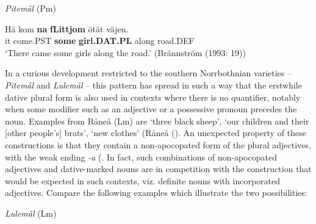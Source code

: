 
\item 

\textit{Pitemål }(Pm)



 \ea\label{}
\gll Hä  kom  \textbf{na}\textbf{  fLi{\textasciigrave}ttjom} ötät  väjen.\\


it  come.PST  \textbf{some} \textbf{girl.DAT.PL} along  road.DEF\\

\glt ‘There came some girls along the road.’ (Brännström (1993: 19)) 

\z

In a curious development restricted to the southern Norrbothnian varieties –  \textit{Pitemål} and \textit{Lulemål} – this pattern has spread in such a way that the erstwhile dative plural form is also used in contexts where there is no quantifier, notably when some modifier such as an adjective or a possessive pronoun precedes the noun. Examples from Råneå (Lm) are  ‘three black sheep’,  ‘our children and their [other people’s] brats’,  ‘new clothes’ (Råneå (\citet{Wikberg2004}). An unexpected property of these constructions is that they contain a non-apocopated form of the plural adjectives, with the weak ending\textit{ {}-a }(\citet[36]{Dahlstedt1956}. In fact, such combinations of non-apocopated adjectives and dative-marked nouns are in competition with the construction that would be expected in such contexts, viz. definite nouns with incorporated adjectives. Compare the following examples which illustrate the two possibilities:


\item 

\textit{Lulemål} (Lm)

